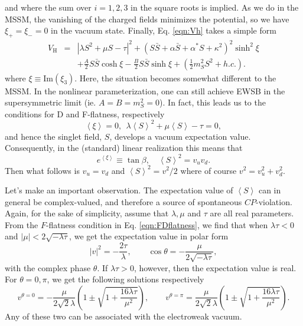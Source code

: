 and where the sum over $i=1,2,3$ in the square roots is implied. As we do in the MSSM, the vanishing of the charged fields minimizes the potential, so we have $\xi_+ = \xi_- =0$ in the vacuum state. Finally, Eq. \ref{eqn:Vh} takes a simple form
\begin{eqnarray}
V_{\text{H}}&=&	\left|\lambda S^{2}+\mu S-\tau\right|^{2} + \left(S\bar{S}+\alpha\bar{S}+\alpha^{*}S+\kappa^{2}\right)^{2}\sinh^2 \xi \nonumber \\
&& +\frac{A}{2} S\bar{S} \cosh \xi - \frac{B}{2}S\bar{S} \sinh \xi + \left( \frac{1}{2}m^2_S S^2 + h.c.\right).
\label{eqn:higgspot}
\end{eqnarray}
where $\xi \equiv \text{Im}(\xi_3)$. Here, the situation becomes somewhat different to the MSSM. In the nonlinear parameterization, one can still achieve EWSB in the supersymmetric limit (ie. $A=B=m^2_S=0$). In fact, this leads us to the conditions for D and F-flatness, respectively
\begin{equation}
\left\langle \xi \right\rangle =0,~~\lambda \left\langle S \right\rangle^{2}+\mu \left\langle S \right\rangle -\tau =0,
\label{eqn:FDflatness}
\end{equation}
and hence the singlet field, $S$, develops a vacuum expectation value. Consequently, in the (standard) linear realization this means that
\begin{equation}
e^{\left\langle \xi\right\rangle }\equiv\tan\beta,\quad\left\langle S\right\rangle ^{2}= v_{u}v_{d}.
\end{equation}
Then what follows is $v_u=v_d$ and ${\left\langle S \right\rangle}^{2}=v^2/2$ where of course $v^2=v^2_u+v^2_d$.

Let's make an important observation. The expectation value of $\left\langle S \right\rangle$ can in general be complex-valued, and therefore a source of spontaneous $CP$-violation. Again, for the sake of simplicity, assume that $\lambda,\mu$ and $\tau$ are all real parameters. From the $F$-flatness condition in Eq. \ref{eqn:FDflatness}, we find that when $\lambda\tau<0$ and $|\mu| < 2 \sqrt{-\lambda\tau}$, we get the expectation value in polar form
\begin{equation}
|v|^2=-\frac{2\tau}{\lambda}, \qquad \cos \theta = -\frac{\mu}{2\sqrt{-\lambda\tau}},
\end{equation}
with the complex phase $\theta$. If $\lambda\tau>0$, however, then the expectation value is real. For $\theta=0,\pi$, we get the following solutions respectively
\begin{equation}
v^{\theta=0}=-\frac{\mu}{2\sqrt{2} \lambda} \left(1 \pm \sqrt{1+\frac{16 \lambda \tau}{\mu^2}} \right),\qquad v^{\theta=\pi}=\frac{\mu}{2\sqrt{2} \lambda} \left(1 \pm \sqrt{1+\frac{16 \lambda \tau}{\mu^2}} \right).
\end{equation}
Any of these two can be associated with the electroweak vacuum.

